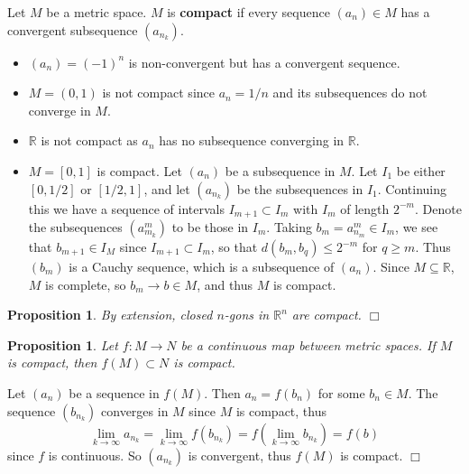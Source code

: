 \documentclass[letter-paper]{tufte-book}
\newtheorem{proposition}[theorem]{\color{pastel-blue}Proposition}
\newenvironment{proof}[1][Proof]{\begin{trivlist}
\item[\hskip \labelsep {\bfseries #1}]}{\end{trivlist}}
\newenvironment{example}[1][Example]{\begin{trivlist}
\item[\hskip \labelsep {\bfseries #1}]}{\end{trivlist}}
\newcommand{\qedwhite}{\hfill \ensuremath{\Box}}
\begin{document}
Let $M$ be a metric space. $M$ is \textbf{compact} if every sequence $(a_n) \in
M$ has a convergent subsequence $(a_{n_k})$.
\begin{example}
  \begin{itemize}
    \item $(a_n) = (-1)^n$ is non-convergent but has a convergent sequence.
    
    \item $M = (0, 1)$ is not compact since $a_n = 1/n$ and its subsequences do
    not converge in $M$.
    
    \item $\mathbb{R}$ is not compact as $a_n$ has no subsequence converging in
    $\mathbb{R}$.
    
    \item $M = [0, 1]$ is compact. Let $(a_n)$ be a subsequence in $M$. Let
    $I_1$ be either $[0, 1/2]$ or $[1/2, 1]$, and let $(a_{n_k})$ be the
    subsequences in $I_1$. Continuing this we have a sequence of intervals
    $I_{m+1} \subset I_m$ with $I_m$ of length $2^{-m}$. Denote the subsequences
    $(a_{m_k}^m)$ to be those in $I_m$. Taking $b_m = a_{n_m}^m \in I_m$, we see
    that $b_{m+1} \in I_M$ since $I_{m+1} \subset I_m$, so that $d(b_m, b_q)
    \leq 2^{-m}$ for $q \geq m$. Thus $(b_m)$ is a Cauchy sequence, which is a
    subsequence of $(a_n)$. Since $M \subseteq \mathbb{R}$, $M$ is complete, so
    $b_m \to b \in M$, and thus $M$ is compact.
  \end{itemize}
\end{example}

\begin{proposition}
  By extension, closed $n$-gons in $\mathbb{R}^n$ are compact. \qedwhite
\end{proposition}

\begin{proposition}
  Let $f : M \to N$ be a continuous map between metric spaces. If $M$ is
  compact, then $f(M) \subset N$ is compact.
\end{proposition}

\begin{proof}
  Let $(a_n)$ be a sequence in $f(M)$. Then $a_n = f(b_n)$ for some $b_n \in M$.
  The sequence $(b_{n_k})$ converges in $M$ since $M$ is compact, thus
  \begin{equation*}
    \lim_{k\to\infty} a_{n_k} = \lim_{k\to\infty} f(b_{n_k})
    = f \left(\lim_{k\to\infty} b_{n_k} \right) = f(b)
  \end{equation*}
  since $f$ is continuous. So $(a_{n_k})$ is convergent, thus $f(M)$ is compact.
  \qedwhite
\end{proof}
\end{document}
